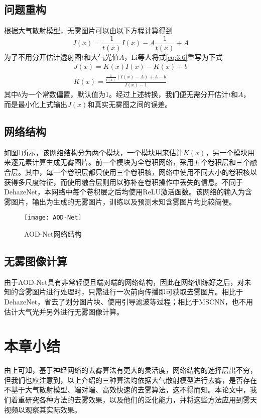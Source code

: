 \documentclass[a4paper, 12pt, oneside]{report}
\begin{document}
{\subsection{问题重构\quad}
根据大气散射模型，无雾图片可以由以下方程计算得到
\begin{equation} \label{eq:3.6}
J(x) = \frac{1}{t(x)}I(x) - A\frac{1}{t(x)} + A
\end{equation}
为了不用分开估计透射图$t$和大气光值$A$，Li等人将式\ref{eq:3.6}重写为下式
\begin{equation} \label{eq:3.7}
\begin{aligned}
J(x) = K(x)I(x) - K(x) + b \\
K(x) = \frac{\frac{1}{t(x)}(I(x) - A) + A - b}{I(x) - 1}
\end{aligned}
\end{equation}
其中$b$为一个常数偏置，默认值为1。经过上述转换，我们便无需分开估计$t$和$A$，而是最小化上式输出$J(x)$和真实无雾图之间的误差。

\subsection{网络结构\quad}

如图\ref{fig:3.9}所示，该网络结构分为两个模块，一个模块用来估计$K(x)$，另一个模块用来逐元素计算生成无雾图片。前一个模块为全卷积网络，采用五个卷积层和三个融合层。其中，每一个卷积层都只使用三个卷积核，网络中使用不同大小的卷积核以获得多尺度特征，而使用融合层则用以弥补在卷积操作中丢失的信息。不同于DehazeNet，本网络中每个卷积层之后均使用ReLU激活函数。该网络的输入为含雾图片，输出为生成的无雾图片，训练以及预测未知含雾图片均比较简便。
\begin{figure}[H]
\centering
\texttt{[image: AOD-Net]}
\caption{AOD-Net网络结构}
\label{fig:3.9}
\end{figure}

\subsection{无雾图像计算\quad}
由于AOD-Net具有非常轻便且端对端的网络结构，因此在网络训练好之后，对未知的含雾图片进行处理时，只需进行一次前向传播即可获取去雾图片。相比于DehazeNet，省去了划分图片块、使用引导滤波等过程；相比于MSCNN，也不用估计大气光并另外进行无雾图像计算。

\section{本章小结\quad}
由上可知，基于神经网络的去雾算法有更大的灵活度，网络结构的选择层出不穷，但我们也应注意到，以上介绍的三种算法均依据大气散射模型进行去雾，是否存在不基于大气散射模型、端对端、高效快速的去雾算法，这不得而知。本论文中，我们着重研究各种方法的去雾效果，以及他们的泛化能力，并将这些方法应用到雾天视频以观察其实际效果。

}
\end{document}

